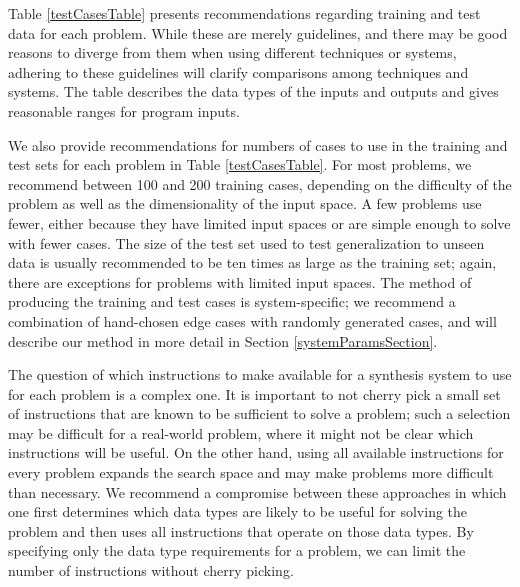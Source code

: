 \documentclass{sig-alternate}
\begin{document}
Table \ref{testCasesTable} presents recommendations regarding training and test data for each problem. While these are merely guidelines, and there may be good reasons to diverge from them when using different techniques or systems, adhering to these guidelines will clarify comparisons among techniques and systems. The table describes the data types of the inputs and outputs and gives reasonable ranges for program inputs. 

We also provide recommendations for numbers of cases to use in the training and test sets for each problem in Table \ref{testCasesTable}. For most problems, we recommend between 100 and 200 training cases, depending on the difficulty of the problem as well as the dimensionality of the input space. A few problems use fewer, either because they have limited input spaces or are simple enough to solve with fewer cases. The size of the test set used to test generalization to unseen data is usually recommended to be ten times as large as the training set; again, there are exceptions for problems with limited input spaces. The method of producing the training and test cases is system-specific; we recommend a combination of hand-chosen edge cases with randomly generated cases, and will describe our method in more detail in Section \ref{systemParamsSection}.


The question of which instructions to make available for a synthesis system to use for each problem is a complex one. It is important to not cherry pick a small set of instructions that are known to be sufficient to solve a problem; such a selection may be difficult for a real-world problem, where it might not be clear which instructions will be useful. On the other hand, using all available instructions for every problem expands the search space and may make problems more difficult than necessary. We recommend a compromise between these approaches
in which one first determines which data types are likely to be useful for solving the problem and then uses all instructions that operate on those data types.
By specifying only the data type requirements for a problem, we can limit the number of instructions without cherry picking. 
\end{document}
